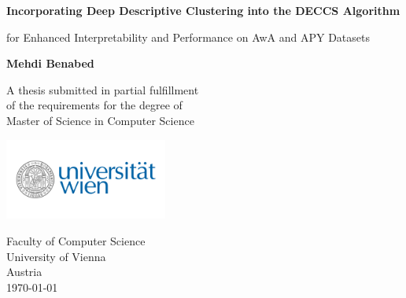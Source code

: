 \documentclass[12pt,a4paper]{report}
\begin{document}
\begin{titlepage}
    \begin{center}
        \vspace*{1cm}

        \Huge
        \textbf{Incorporating Deep Descriptive Clustering into the DECCS Algorithm}

        \vspace{0.5cm}
        \LARGE
        for Enhanced Interpretability and Performance on AwA and APY Datasets

        \vspace{1.5cm}

        \textbf{Mehdi Benabed}

        \vfill

        A thesis submitted in partial fulfillment\\
        of the requirements for the degree of\\
        Master of Science in Computer Science

        \vspace{0.8cm}

        \includegraphics[width=0.4\textwidth]{figs/Uni_Logo_2016.png}

        \Large
        Faculty of Computer Science\\
        University of Vienna\\
        Austria\\
        \today

    \end{center}
\end{titlepage}
\end{document}
